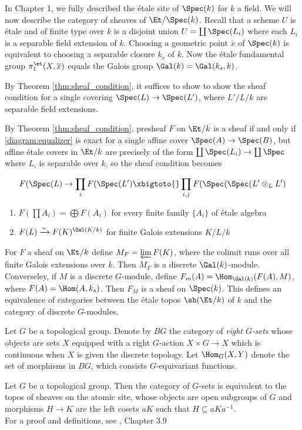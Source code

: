 In Chapter 1, we fully described the \'etale site of $\Spec(k)$ for $k$ a field. We will now describe the category of sheaves of $\Et/\Spec(k)$.
Recall that a scheme $U$ is \'etale and of finite type over $k$ is a disjoint union $U = \coprod \Spec(L_i)$ where each $L_i$ is a separable field extension of $k$. Choosing a geometric point $\overline{x}$ of $\Spec(k)$ is equivalent to choosing a separable closure $k_s$ of $k$. Now the \'etale fundamental group $\pi_1^\et(X, \overline{x})$ equals the Galois group $\Gal(k) = \Gal(k_s, k)$.

By Theorem \ref{thm:sheaf_condition}, it suffices to show to show the sheaf condition for a single covering $\Spec(L) \to \Spec(L')$, where $L'/L/k$ are separable field extensions.

By Theorem \ref{thm:sheaf_condition}, presheaf $F$ on $\Et/k$ is a sheaf if and only if \ref{diagram:equalizer} is exact for a single affine cover $\Spec(A) \to \Spec(B)$, but affine \'etale covers in $\Et/k$ are precisely of the form $\coprod \Spec(L_i) \to \coprod \Spec$ where $L_i$ is separable over $k$, so the sheaf condition becomes

\[
	F(\Spec(L) \to \prod_{i} F(\Spec(L') \xbigtoto{} \prod_{i,j} F(\Spec(\Spec(L' \otimes_L L')
\]

\begin{enumerate}
	\item $F(\prod A_i) = \bigoplus F(A_i)$ for every finite family $\{A_i\}$ of \'etale algebra
	\item $F(L) \xrightarrow{\sim} F(K)^{\Gal(K/k)}$ for finite Galois extensions $K/L/k$
\end{enumerate}
For $F$ a sheaf on $\Et/k$ define $M_F = \varprojlim F(K)$, where the colimit runs over all finite Galois extensions over $k$. Then $M_F$ is a discrete $\Gal(k)$-module. Converseley, if $M$ is a discrete $G$-module, define $F_m(A) = \Hom_{\Gal(k)}(F(A),M)$, where $F(A) = \Hom(A, k_s)$. Then $F_M$ is a sheaf on $\Spec(k)$. This defines an equivalence of categories between the \'etale topos $\sh(\Et/k)$ of $k$ and the category of discrete $G$-modules.

\begin{construction}
	Let $G$ be a topological group. Denote by $BG$ the category of \textit{right $G$-sets} whose objects are sets $X$ equipped with a right $G$-action $X \times G \to X$ which is continuous when $X$ is given the discrete topology. Let $\Hom_G(X,Y)$ denote the set of morphisms in $BG$, which consists $G$-equivariant functions.
\end{construction}

\begin{theorem}
	Let $G$ be a topological group. Then the category of $G$-sets is equivalent to the topos of sheaves on the atomic site, whose objects are open subgroups of $G$ and morphisms $H \to K$ are the left cosets $aK$ such that $H \subseteq aKa^{-1}$.\\
	For a proof and definitions, see \cite{MacLane/Moerdijk:1994}, Chapter 3.9
\end{theorem}
